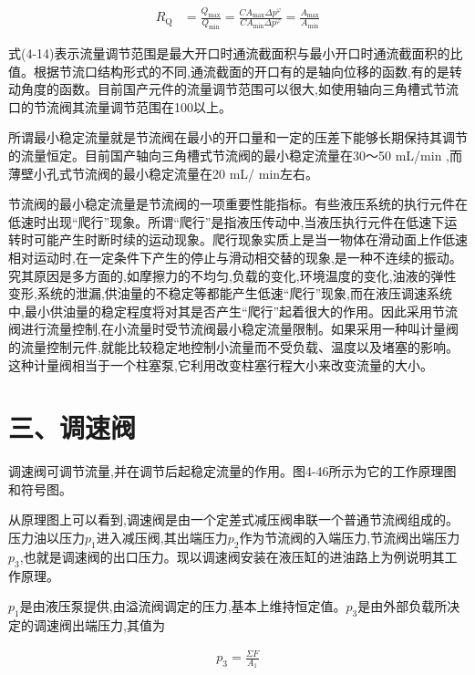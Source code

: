 \begin{equation}
\begin{split}
R_\text{Q} & =\frac{Q_\text{max}}{Q_\text{min}} = \frac{CA_\text{max}\Delta p^\varphi}{CA_\text{min}\Delta p^\varphi} = \frac{A_\text{max}}{A_\text{min}}
\end{split}
\end{equation}

式(4-14)表示流量调节范围是最大开口时通流截面积与最小开口时通流截面积的比值。根据节流口结构形式的不同,通流截面的开口有的是轴向位移的函数,有的是转动角度的函数。目前国产元件的流量调节范围可以很大,如使用轴向三角槽式节流口的节流阀其流量调节范围在100以上。

所谓最小稳定流量就是节流阀在最小的开口量和一定的压差下能够长期保持其调节的流量恒定。目前国产轴向三角槽式节流阀的最小稳定流量在30～50 mL/min ,而薄壁小孔式节流阀的最小稳定流量在20 mL/ min左右。

节流阀的最小稳定流量是节流阀的一项重要性能指标。有些液压系统的执行元件在低速时出现“爬行”现象。所谓“爬行”是指液压传动中,当液压执行元件在低速下运转时可能产生时断时续的运动现象。爬行现象实质上是当一物体在滑动面上作低速相对运动时,在一定条件下产生的停止与滑动相交替的现象,是一种不连续的振动。究其原因是多方面的,如摩擦力的不均匀,负载的变化,环境温度的变化,油液的弹性变形,系统的泄漏,供油量的不稳定等都能产生低速“爬行”现象,而在液压调速系统中,最小供油量的稳定程度将对其是否产生“爬行”起着很大的作用。因此采用节流阀进行流量控制,在小流量时受节流阀最小稳定流量限制。如果采用一种叫计量阀的流量控制元件,就能比较稳定地控制小流量而不受负载、温度以及堵塞的影响。这种计量阀相当于一个柱塞泵,它利用改变柱塞行程大小来改变流量的大小。

\section*{三、调速阀}

调速阀可调节流量,并在调节后起稳定流量的作用。图4-46所示为它的工作原理图和符号图。

从原理图上可以看到,调速阀是由一个定差式减压阀串联一个普通节流阀组成的。压力油以压力$p_1$进入减压阀,其出端压力$p_2$作为节流阀的入端压力,节流阀出端压力$p_3$,也就是调速阀的出口压力。现以调速阀安装在液压缸的进油路上为例说明其工作原理。

$p_1$是由液压泵提供,由溢流阀调定的压力,基本上维持恒定值。$p_3$是由外部负载所决定的调速阀出端压力,其值为

\begin{equation}
\begin{split}
p_3 = \frac{\Sigma F}{A_1}
\end{split}
\end{equation}

